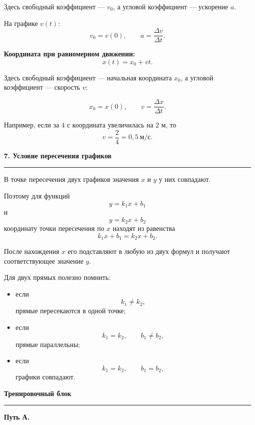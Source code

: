 \documentclass[a4paper,12pt]{article}
\newcommand{\topic}[1]{%
    \vspace{0.5em}%
    {\Large\bfseries\color{darkaccent}#1}%
    \par\vspace{0.35em}%
    {\color{softgray}\rule{\linewidth}{0.7pt}}%
    \vspace{0.45em}%
}
\begin{document}
Здесь свободный коэффициент --- $v_0$,
а угловой коэффициент --- ускорение $a$.

На графике $v(t)$:
\[
    v_0=v(0),
    \qquad
    a=\frac{\Delta v}{\Delta t}.
\]

\textbf{Координата при равномерном движении:}
\[
    x(t)=x_0+vt.
\]

Здесь свободный коэффициент ---
начальная координата $x_0$,
а угловой коэффициент --- скорость $v$:

\[
    x_0=x(0),
    \qquad
    v=\frac{\Delta x}{\Delta t}.
\]

Например, если за $4$ с координата увеличилась
на $2$ м, то
\[
    v=
    \frac{2}{4}
    =
    0{,}5\ \text{м/с}.
\]


\clearpage

\topic{7. Условие пересечения графиков}

В точке пересечения двух графиков
значения $x$ и $y$ у них совпадают.

Поэтому для функций
\[
    y=k_1x+b_1
\]
и
\[
    y=k_2x+b_2
\]
координату точки пересечения по $x$
находят из равенства
\[
    k_1x+b_1
    =
    k_2x+b_2.
\]

После нахождения $x$
его подставляют в любую из двух формул
и получают соответствующее значение $y$.

Для двух прямых полезно помнить:

\begin{itemize}
    \item если
    \[
        k_1\ne k_2,
    \]
    прямые пересекаются в одной точке;

    \item если
    \[
        k_1=k_2,
        \qquad
        b_1\ne b_2,
    \]
    прямые параллельны;

    \item если
    \[
        k_1=k_2,
        \qquad
        b_1=b_2,
    \]
    графики совпадают.
\end{itemize}


\clearpage

\topic{Тренировочный блок}

\textbf{Путь А.}
\end{document}

